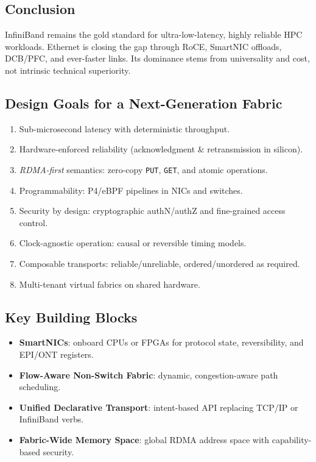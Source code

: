 \subsection{Conclusion}
InfiniBand remains the gold standard for ultra-low-latency, highly
reliable HPC workloads.  Ethernet is closing the gap through RoCE,
SmartNIC offloads, DCB/PFC, and ever-faster links.  Its dominance stems
from universality and cost, not intrinsic technical superiority.

\subsection{Design Goals for a Next-Generation Fabric}
\begin{enumerate}
  \item Sub-microsecond latency with deterministic throughput.
  \item Hardware-enforced reliability (acknowledgment \& retransmission
        in silicon).
  \item \emph{RDMA-first} semantics: zero-copy \texttt{PUT}, \texttt{GET},
        and atomic operations.
  \item Programmability: P4/eBPF pipelines in NICs and switches.
  \item Security by design: cryptographic authN/authZ and fine-grained
        access control.
  \item Clock-agnostic operation: causal or reversible timing models.
  \item Composable transports: reliable/unreliable, ordered/unordered
        as required.
  \item Multi-tenant virtual fabrics on shared hardware.
\end{enumerate}

\subsection{Key Building Blocks}
\begin{itemize}
  \item \textbf{SmartNICs}: onboard CPUs or FPGAs for protocol state,
        reversibility, and EPI/ONT registers.
  \item \textbf{Flow-Aware Non-Switch Fabric}: dynamic,
        congestion-aware path scheduling.
  \item \textbf{Unified Declarative Transport}: intent-based API
        replacing TCP/IP or InfiniBand verbs.
  \item \textbf{Fabric-Wide Memory Space}: global RDMA address space
        with capability-based security.
\end{itemize}


